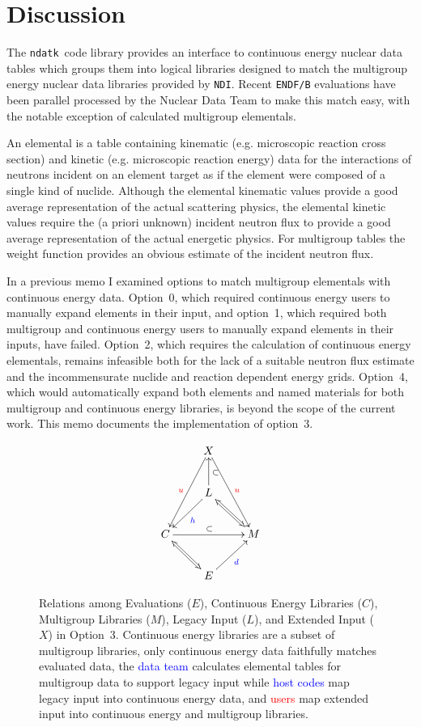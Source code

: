 \documentclass[12pt]{lamemo}
\newcommand{\ndatk}{\texttt{ndatk}}
\newcommand{\NDI}{\texttt{NDI}}
\begin{document}
\newpage

\section{Discussion}

The \ndatk\ code library\cite{gray14} provides an interface to
continuous energy nuclear data tables which groups them into logical
libraries designed to match the multigroup energy nuclear data
libraries provided by \NDI.  Recent \texttt{ENDF/B} evaluations have
been parallel processed by the Nuclear Data Team to make this match
easy, with the notable exception of calculated multigroup elementals.

An elemental is a table containing kinematic (e.g. microscopic
reaction cross section) and kinetic (e.g. microscopic reaction energy)
data for the interactions of neutrons incident on an element target as
if the element were composed of a single kind of nuclide.  Although
the elemental kinematic values provide a good average representation
of the actual scattering physics, the elemental kinetic values require
the (a priori unknown) incident neutron flux to provide a good average
representation of the actual energetic physics.  For multigroup tables
the weight function provides an obvious estimate of the incident
neutron flux\cite[Eq.~3]{gray09}.

In a previous memo\cite{gray15} I examined options to match multigroup
elementals with continuous energy data.  Option~0, which required
continuous energy users to manually expand elements in their input,
and option~1, which required both multigroup and continuous energy
users to manually expand elements in their inputs, have failed.
Option~2, which requires the calculation of continuous energy
elementals, remains infeasible both for the lack of a suitable neutron
flux estimate and the incommensurate nuclide and reaction dependent
energy grids.  Option~4, which would automatically expand both
elements and named materials for both multigroup and continuous energy
libraries, is beyond the scope of the current work.  This memo
documents the implementation of option~3.

\begin{figure}\centering
\[
\xymatrix{
  & X \ar[ddl]_{\textcolor{red}{u}} \ar[ddr]^{\textcolor{red}{u}} & \\
  & L \ar[dl]^{\textcolor{blue}{h}} \ar@{<=>}[dr] \ar[u]_{\subset} & \\
  C \ar[rr]^{\subset} & & M \\
  & E \ar@{<=>}[ul] \ar[ur]_{\textcolor{blue}{d}} &
}
\]
\caption{Relations among Evaluations ($E$), Continuous Energy Libraries
  ($C$), Multigroup Libraries ($M$), Legacy Input ($L$), and Extended Input
  ($X$) in Option~3.  Continuous energy libraries are a subset of
  multigroup libraries, only continuous energy data faithfully matches
  evaluated data, the \textcolor{blue}{data team} calculates elemental
  tables for multigroup data to support legacy input while
  \textcolor{blue}{host codes} map legacy input into continuous energy
  data, and \textcolor{red}{users} map extended input into continuous
  energy and multigroup libraries.} \label{fig:3}
\end{figure}
\end{document}
